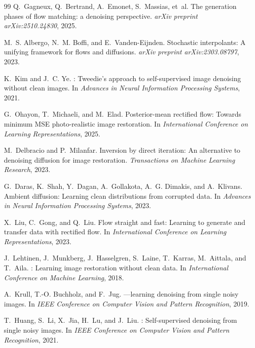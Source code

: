 \documentclass[letterpaper]{article} %
\begin{document}
\begin{thebibliography}{99}
Q.~Gagneux, Q.~Bertrand, A.~Emonet, S.~Massias, et~al.
\newblock The generation phases of flow matching: a denoising perspective.
\newblock \emph{arXiv preprint arXiv:2510.24830}, 2025.

M.~S. Albergo, N.~M. Boffi, and E.~Vanden-Eijnden.
\newblock Stochastic interpolants: A unifying framework for flows and diffusions.
\newblock \emph{arXiv preprint arXiv:2303.08797}, 2023.

K.~Kim and J.~C. Ye.
: Tweedie's approach to self-supervised image denoising
  without clean images.
\newblock In \emph{Advances in Neural Information Processing Systems}, 2021.

G.~Ohayon, T.~Michaeli, and M.~Elad.
\newblock Posterior-mean rectified flow: Towards minimum {MSE} photo-realistic
  image restoration.
\newblock In \emph{International Conference on Learning Representations}, 2025.

M.~Delbracio and P.~Milanfar.
\newblock Inversion by direct iteration: An alternative to denoising diffusion
  for image restoration.
\newblock \emph{Transactions on Machine Learning Research}, 2023.

G.~Daras, K.~Shah, Y.~Dagan, A.~Gollakota, A.~G. Dimakis, and A.~Klivans.
\newblock Ambient diffusion: Learning clean distributions from corrupted data.
\newblock In \emph{Advances in Neural Information Processing Systems}, 2023.

X.~Liu, C.~Gong, and Q.~Liu.
\newblock Flow straight and fast: Learning to generate and transfer data with
  rectified flow.
\newblock In \emph{International Conference on Learning Representations}, 2023.

J.~Lehtinen, J.~Munkberg, J.~Hasselgren, S.~Laine, T.~Karras, M.~Aittala,
  and T.~Aila.
: Learning image restoration without clean data.
\newblock In \emph{International Conference on Machine Learning}, 2018.

A.~Krull, T.-O. Buchholz, and F.~Jug.
---learning denoising from single noisy images.
\newblock In \emph{IEEE Conference on Computer Vision and Pattern Recognition},
  2019.

T.~Huang, S.~Li, X.~Jia, H.~Lu, and J.~Liu.
: Self-supervised denoising from single noisy
  images.
\newblock In \emph{IEEE Conference on Computer Vision and Pattern Recognition},
  2021.


\end{thebibliography}
\end{document}
